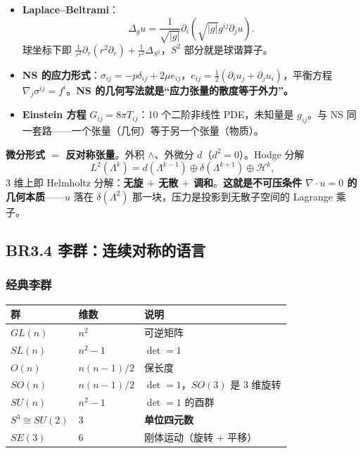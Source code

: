 \begin{itemize}
  \item \textbf{Laplace--Beltrami}：
  \[
  \Delta_gu=\frac{1}{\sqrt{|g|}}\partial_i\left(\sqrt{|g|}g^{ij}\partial_ju\right).
  \]
  球坐标下即 $\frac{1}{r^2}\partial_r(r^2\partial_r)+\frac{1}{r^2}\Delta_{S^2}$，$S^2$ 部分就是球谐算子。
  \item \textbf{NS 的应力形式}：$\sigma_{ij}=-p\delta_{ij}+2\mu e_{ij}$，$e_{ij}=\frac12(\partial_iu_j+\partial_ju_i)$，平衡方程 $\nabla_j\sigma^{ij}=f^i$。\textbf{NS 的几何写法就是“应力张量的散度等于外力”。}
  \item \textbf{Einstein 方程} $G_{ij}=8\pi T_{ij}$：10 个二阶非线性 PDE，未知量是 $g_{ij}$。与 NS 同一套路——一个张量（几何）等于另一个张量（物质）。
\end{itemize}

\textbf{微分形式 $=$ 反对称张量}。外积 $\wedge$、外微分 $d$（$d^2=0$）。Hodge 分解
\[
L^2(\Lambda^k)=d(\Lambda^{k-1})\oplus\delta(\Lambda^{k+1})\oplus\mathcal{H}^k ,
\]
3 维上即 Helmholtz 分解：\textbf{无旋 $+$ 无散 $+$ 调和}。\textbf{这就是不可压条件 $\nabla\cdot u=0$ 的几何本质}——$u$ 落在 $\delta(\Lambda^2)$ 那一块，压力是投影到无散子空间的 Lagrange 乘子。

\subsection{BR3.4 李群：连续对称的语言}

\subsubsection{经典李群}

\begin{center}
\begin{tabular}{L{2.8cm}L{1.6cm}L{6cm}}
\toprule
\textbf{群} & \textbf{维数} & \textbf{说明} \\
\midrule
$GL(n)$ & $n^2$ & 可逆矩阵 \\
$SL(n)$ & $n^2-1$ & $\det=1$ \\
$O(n)$ & $n(n-1)/2$ & 保长度 \\
$SO(n)$ & $n(n-1)/2$ & $\det=1$，$SO(3)$ 是 3 维旋转 \\
$SU(n)$ & $n^2-1$ & $\det=1$ 的酉群 \\
$S^3\cong SU(2)$ & 3 & \textbf{单位四元数} \\
$SE(3)$ & 6 & 刚体运动（旋转 $+$ 平移） \\
\bottomrule
\end{tabular}
\end{center}

